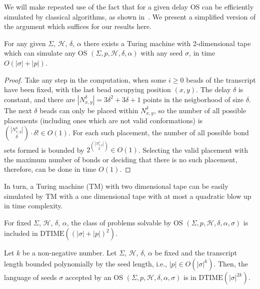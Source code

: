 \documentclass[]{llncs}
\newcommand{\bond}{\mathcal{H}}
\begin{document}
We will make repeated use of the fact that for a given delay OS can be efficiently simulated by classical algorithms, as shown in~\cite{simulation}. We present a simplified version of the argument which suffices for our results here.
\begin{theorem}
For any given $\Sigma$, $\bond$, $\delta$, $\alpha$ there exists a Turing machine with 2-dimensional tape which can simulate any OS $(\Sigma, p, \bond, \delta, \alpha)$ with any seed $\sigma$, in time $O(|\sigma|+|p|)$.
\end{theorem}
\begin{proof}
Take any step in the computation, when some $i\geq 0$ beads of the transcript have been fixed, with the last bead occupying position $(x,y)$. The delay $\delta$ is constant, and there are $|N_{x,y}^\delta|=3\delta^2+3\delta+1$ points in the neigborhood of size $\delta$. The next $\delta$ beads can only be placed within $N_{x,y}^\delta$, so the number of all possible placements (including ones which are not valid conformations) is ${|N_{x,y}^\delta|\choose \delta}\cdot \delta!\in O(1)$. For each such placement, the number of all possible bond sets formed is bounded by $2^{|N_{x,y}^\delta|\choose 2}\in O(1)$. Selecting the valid placement with the maximum number of bonds or deciding that there is no such placement, therefore, can be done in time $O(1)$.
\end{proof}

In turn, a Turing machine (TM) with two dimensional tape can be easily simulated by TM with a one dimensional tape with at most a quadratic blow up in time complexity.



\begin{corollary}
For fixed $\Sigma$, $\bond$, $\delta$, $\alpha$, the class of problems solvable by OS $(\Sigma, p, \bond, \delta, \alpha, \sigma)$ is included in $\mathrm{DTIME}((|\sigma|+|p|)^2)$.
\end{corollary}

\begin{corollary}\label{polytranscript}
Let $k$ be a non-negative number. Let $\Sigma$, $\bond$, $\delta$, $\alpha$ be fixed and the transcript length bounded polynomially by the seed length, i.e., $|p|\in O(|\sigma|^k)$. Then, the language of seeds $\sigma$ accepted by an OS $(\Sigma, p, \bond, \delta, \alpha, \sigma)$ is in $\mathrm{DTIME}(|\sigma|^{2k})$.
\end{corollary}
\end{document}
